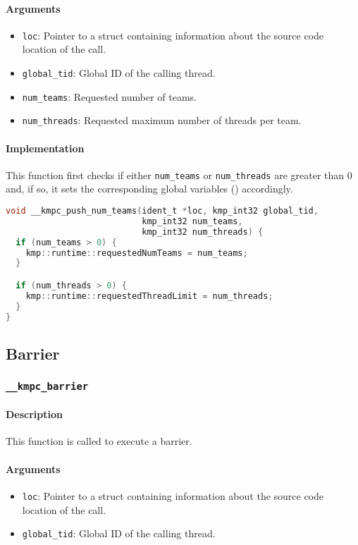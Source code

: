 \paragraph{Arguments}
\begin{itemize}
	\item \texttt{loc}: Pointer to a struct containing information about the source code location
	      of the call.
	\item \texttt{global\_tid}: Global ID of the calling thread.
	\item \texttt{num\_teams}: Requested number of teams.
	\item \texttt{num\_threads}: Requested maximum number of threads per team.
\end{itemize}

\paragraph{Implementation} This function first checks if either \texttt{num\_teams} or
\texttt{num\_threads} are greater than 0 and, if so, it sets the corresponding global variables
() accordingly.

\begin{lstlisting}[language=C, caption={__kmpc_push_num_teams}, label={lst:kmpc-push-num-teams}, escapechar=@]
void __kmpc_push_num_teams(ident_t *loc, kmp_int32 global_tid,
                           kmp_int32 num_teams,
                           kmp_int32 num_threads) {
  if (num_teams > 0) {
    kmp::runtime::requestedNumTeams = num_teams;
  }

  if (num_threads > 0) {
    kmp::runtime::requestedThreadLimit = num_threads;
  }
}
\end{lstlisting}

\subsection{Barrier}

\subsubsection{\texttt{__kmpc_barrier}}
\label{subsubsec:kmpc-barrier}

\paragraph{Description} This function is called to execute a barrier.

\paragraph{Arguments}
\begin{itemize}
	\item \texttt{loc}: Pointer to a struct containing information about the source code location
	      of the call.
      \item \texttt{global\_tid}: Global ID of the calling thread.
\end{itemize}

